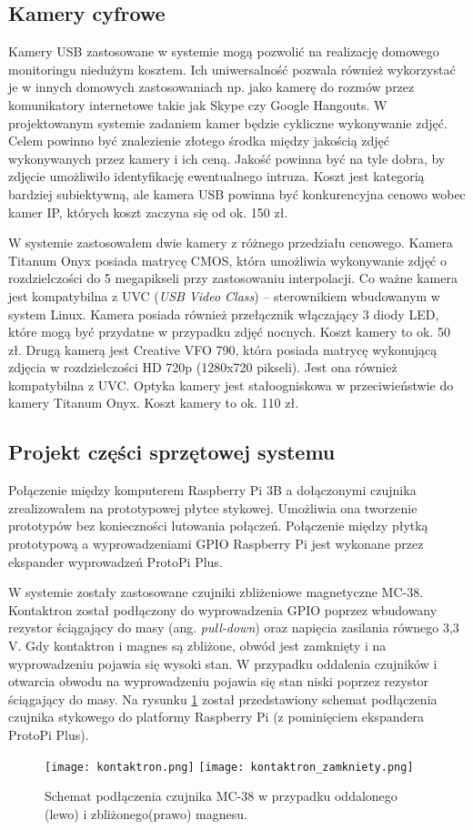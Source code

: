 \documentclass[a4paper,11pt,twoside]{article}
\begin{document}
\subsection{Kamery cyfrowe}
Kamery USB zastosowane w systemie mogą pozwolić na realizację domowego monitoringu niedużym kosztem. Ich uniwersalność pozwala również wykorzystać je w innych domowych zastosowaniach np. jako kamerę do rozmów przez komunikatory internetowe takie jak Skype czy Google Hangouts. W projektowanym systemie zadaniem kamer będzie cykliczne wykonywanie zdjęć. Celem powinno być znalezienie złotego środka między jakością zdjęć wykonywanych przez kamery i ich ceną. Jakość powinna być na tyle dobra, by zdjęcie umożliwiło identyfikację ewentualnego intruza. Koszt jest kategorią bardziej subiektywną, ale kamera USB powinna być konkurencyjna cenowo wobec kamer IP, których koszt zaczyna się od ok. 150 zł.\cite{komputer_świat}

W systemie zastosowałem dwie kamery z różnego przedziału cenowego. Kamera Titanum Onyx posiada matrycę CMOS, która umożliwia wykonywanie zdjęć o rozdzielczości do 5 megapikseli przy zastosowaniu interpolacji. Co ważne kamera jest kompatybilna z UVC (\textit{USB Video Class}) -- sterownikiem wbudowanym w system Linux. Kamera posiada również przełącznik włączający 3 diody LED, które mogą być przydatne w przypadku zdjęć nocnych. Koszt kamery to ok. 50 zł. Drugą kamerą jest Creative VFO 790, która posiada matrycę wykonującą zdjęcia w rozdzielczości HD 720p (1280x720 pikseli). Jest ona również kompatybilna z UVC. Optyka kamery jest stałoogniskowa w przeciwieństwie do kamery Titanum Onyx. Koszt kamery to ok. 110 zł.

\subsection{Projekt części sprzętowej systemu}
Połączenie między komputerem Raspberry Pi 3B a dołączonymi czujnika zrealizowałem na prototypowej płytce stykowej. Umożliwia ona tworzenie prototypów bez konieczności lutowania połączeń. Połączenie między płytką prototypową a wyprowadzeniami GPIO Raspberry Pi jest wykonane przez ekspander wyprowadzeń ProtoPi Plus.

W systemie zostały zastosowane czujniki zbliżeniowe magnetyczne MC-38. Kontaktron został podłączony do wyprowadzenia GPIO poprzez wbudowany rezystor ściągający do masy (ang. \textit{pull-down}) oraz napięcia zasilania równego 3,3 V. Gdy kontaktron i magnes są zbliżone, obwód jest zamknięty i na wyprowadzeniu pojawia się wysoki stan. W przypadku oddalenia czujników i otwarcia obwodu na wyprowadzeniu pojawia się stan niski poprzez rezystor ściągający do masy. Na rysunku \ref{fig: kontaktron} został przedstawiony schemat podłączenia czujnika stykowego do platformy Raspberry Pi (z pominięciem ekspandera ProtoPi Plus).
\begin{figure}[h]
\texttt{[image: kontaktron.png]}
\texttt{[image: kontaktron\_zamkniety.png]}
\caption{Schemat podłączenia czujnika MC-38 w przypadku oddalonego (lewo) i zbliżonego(prawo) magnesu.}
\label{fig: kontaktron}
\end{figure}
\end{document}
